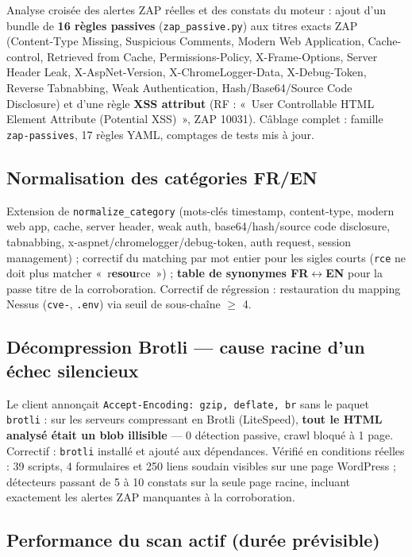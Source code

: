 \documentclass[11pt,a4paper]{report}
\newcommand{\code}[1]{\texttt{#1}}
\begin{document}
Analyse croisée des alertes ZAP réelles et des constats du moteur : ajout d'un bundle de
\textbf{16 règles passives} (\code{zap\_passive.py}) aux titres exacts ZAP (Content-Type
Missing, Suspicious Comments, Modern Web Application, Cache-control, Retrieved from Cache,
Permissions-Policy, X-Frame-Options, Server Header Leak, X-AspNet-Version,
X-ChromeLogger-Data, X-Debug-Token, Reverse Tabnabbing, Weak Authentication,
Hash/Base64/Source Code Disclosure) et d'une règle \textbf{XSS attribut} (RF : «~User
Controllable HTML Element Attribute (Potential XSS)~», ZAP 10031). Câblage complet :
famille \code{zap-passives}, 17 règles YAML, comptages de tests mis à jour.

\subsection{Normalisation des catégories FR/EN}

Extension de \code{normalize\_category} (mots-clés timestamp, content-type, modern web app,
cache, server header, weak auth, base64/hash/source code disclosure, tabnabbing,
x-aspnet/chromelogger/debug-token, auth request, session management) ; correctif du
matching par mot entier pour les sigles courts (\code{rce} ne doit plus matcher
«~r\textbf{esou}rce~») ; \textbf{table de synonymes FR$\leftrightarrow$EN} pour la passe
titre de la corroboration. Correctif de régression : restauration du mapping Nessus
(\code{cve-}, \code{.env}) via seuil de sous-chaîne $\geq$ 4.

\subsection{Décompression Brotli --- cause racine d'un échec silencieux}

Le client annonçait \code{Accept-Encoding: gzip, deflate, br} sans le paquet
\code{brotli} : sur les serveurs compressant en Brotli (LiteSpeed), \textbf{tout le HTML
analysé était un blob illisible} --- 0 détection passive, crawl bloqué à 1 page. Correctif :
\code{brotli} installé et ajouté aux dépendances. Vérifié en conditions réelles : 39
scripts, 4 formulaires et 250 liens soudain visibles sur une page WordPress ; détecteurs
passant de 5 à 10 constats sur la seule page racine, incluant exactement les alertes ZAP
manquantes à la corroboration.

\subsection{Performance du scan actif (durée prévisible)}
\end{document}
